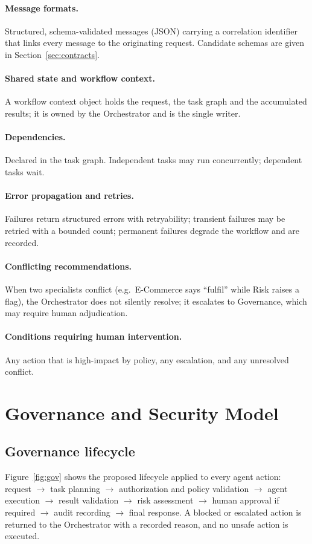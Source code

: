 \documentclass[11pt,a4paper]{article}
\begin{document}
\paragraph{Message formats.} Structured, schema-validated messages (JSON) carrying a correlation identifier that links every message to the originating request. Candidate schemas are given in Section~\ref{sec:contracts}.
\paragraph{Shared state and workflow context.} A workflow context object holds the request, the task graph and the accumulated results; it is owned by the Orchestrator and is the single writer.
\paragraph{Dependencies.} Declared in the task graph. Independent tasks may run concurrently; dependent tasks wait.
\paragraph{Error propagation and retries.} Failures return structured errors with retryability; transient failures may be retried with a bounded count; permanent failures degrade the workflow and are recorded.
\paragraph{Conflicting recommendations.} When two specialists conflict (e.g.\ E-Commerce says ``fulfil'' while Risk raises a flag), the Orchestrator does not silently resolve; it escalates to Governance, which may require human adjudication.
\paragraph{Conditions requiring human intervention.} Any action that is high-impact by policy, any escalation, and any unresolved conflict.

\section{Governance and Security Model}
\label{sec:governance}
\subsection{Governance lifecycle}
Figure~\ref{fig:gov} shows the proposed lifecycle applied to every agent action: request $\rightarrow$ task planning $\rightarrow$ authorization and policy validation $\rightarrow$ agent execution $\rightarrow$ result validation $\rightarrow$ risk assessment $\rightarrow$ human approval if required $\rightarrow$ audit recording $\rightarrow$ final response. A blocked or escalated action is returned to the Orchestrator with a recorded reason, and no unsafe action is executed.
\end{document}
